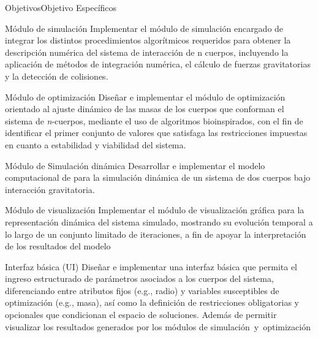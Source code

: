 \begin{frame}[allowframebreaks]{Objetivos}{Objetivo Específicos}%
    \begin{block}{\fontsize{10pt}{12pt}\selectfont Módulo de simulación}{\fontsize{8pt}{10pt}\selectfont
        Implementar el módulo de simulación encargado de integrar los distintos procedimientos algorítmicos requeridos para obtener la descripción numérica del sistema de interacción de n cuerpos, incluyendo la aplicación de métodos de integración numérica, el cálculo de fuerzas gravitatorias y la detección de colisiones.
        }
    \end{block}
    \begin{block}{\fontsize{10pt}{12pt}\selectfont Módulo de optimización}{\fontsize{8pt}{10pt}\selectfont
        Diseñar e implementar el módulo de optimización orientado al ajuste dinámico de las masas de los cuerpos que conforman el sistema de \textit{n}-cuerpos, mediante el uso de algoritmos bioinspirados, con el fin de identificar el primer conjunto de valores que satisfaga las restricciones impuestas en cuanto a estabilidad y viabilidad del sistema.
        }
    \end{block}
    \framebreak%
    \begin{block}{\fontsize{10pt}{12pt}\selectfont Módulo de Simulación dinámica}{\fontsize{8pt}{10pt}\selectfont
        Desarrollar e implementar el modelo computacional de para la simulación dinámica de un sistema de dos cuerpos bajo interacción gravitatoria.
        }
    \end{block}
    \begin{block}{\fontsize{10pt}{12pt}\selectfont Módulo de visualización}{\fontsize{8pt}{10pt}\selectfont
        Implementar el módulo de visualización gráfica para la representación dinámica del sistema simulado, mostrando su evolución temporal a lo largo de un conjunto limitado de iteraciones, a fin de apoyar la interpretación de los resultados del modelo
        }
    \end{block}
    \framebreak%
    \begin{block}{\fontsize{10pt}{12pt}\selectfont Interfaz básica (UI)}{\fontsize{8pt}{10pt}\selectfont
        Diseñar e implementar una interfaz básica que permita el ingreso estructurado de parámetros asociados a los cuerpos del sistema, diferenciando entre atributos fijos (e.g., radio) y variables susceptibles de optimización (e.g., masa), así como la definición de restricciones obligatorias y opcionales que condicionan el espacio de soluciones. Además de permitir visualizar los resultados generados por los módulos de simulación y optimización
        }
    \end{block}
\end{frame}

